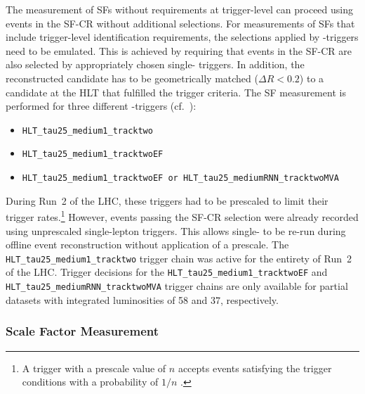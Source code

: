 The measurement of SFs without requirements at trigger-level can proceed using
events in the SF-CR without additional selections. For measurements of SFs that
include trigger-level identification requirements, the selections applied by
\tauhadvis-triggers need to be emulated. This is achieved by requiring that
events in the SF-CR are also selected by appropriately chosen single-\tauhadvis
triggers. In addition, the reconstructed \tauhadvis candidate has to be
geometrically matched ($\Delta R < 0.2$) to a \tauhadvis candidate at the HLT
that fulfilled the trigger criteria. The SF measurement is performed for three
different \tauhadvis-triggers (cf.\ ):
\begin{itemize}
\item \verb|HLT_tau25_medium1_tracktwo| %
\item \verb|HLT_tau25_medium1_tracktwoEF| %
\item \verb|HLT_tau25_medium1_tracktwoEF or HLT_tau25_mediumRNN_tracktwoMVA|
\end{itemize}
During Run~2 of the LHC, these triggers had to be prescaled to limit their
trigger rates.\footnote{A trigger with a prescale value of $n$ accepts events
  satisfying the trigger conditions with a probability of $1 / n$
  \cite{TRIG-2019-04}.} However, events passing the SF-CR selection were already
recorded using unprescaled single-lepton triggers. This allows single-\tauhadvis
to be re-run during offline event reconstruction without application of a
prescale.
The \verb|HLT_tau25_medium1_tracktwo| trigger chain was active for the entirety
of Run~2 of the LHC. Trigger decisions for the
\verb|HLT_tau25_medium1_tracktwoEF| and \verb|HLT_tau25_mediumRNN_tracktwoMVA|
trigger chains are only available for partial datasets with integrated
luminosities of \SI{58}{\ifb} and \SI{37}{\ifb}, respectively.


\subsubsection{Scale Factor Measurement}

